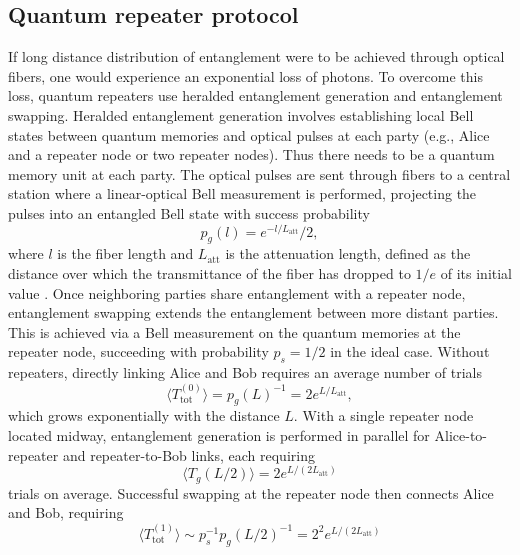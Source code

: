 \subsection{Quantum repeater protocol}
If long distance distribution of entanglement were to be achieved through optical fibers, one would experience an exponential loss of photons.
 To overcome this loss, quantum repeaters use heralded entanglement generation and entanglement swapping.
 Heralded entanglement generation involves establishing
 local Bell states between quantum memories and optical pulses at each party (e.g., Alice and a repeater node or two repeater nodes).
 Thus there needs to be a quantum memory unit at each party. The optical pulses are sent through fibers to a central station where a linear-optical Bell measurement is performed,
 projecting the pulses into an entangled Bell state with success probability 
 \begin{equation}
    p_g(l) = e^{-l/L_{\text{att}}}/2,
 \end{equation}
 where $l$ is the fiber length and $L_{\text{att}}$ is the attenuation length, defined as the distance over which the transmittance of the fiber has dropped to $1/e$ of its initial value \cite{Azuma:2023}.%
 Once neighboring parties share entanglement with a repeater node, entanglement swapping extends the entanglement between more distant parties.
 This is achieved via a Bell measurement on the quantum memories at the repeater node, succeeding with probability $p_s = 1/2$ in the ideal case.
 Without repeaters, directly linking Alice and Bob requires an average number of trials 
 \begin{equation}
    \langle T^{(0)}_{\text{tot}} \rangle = p_g(L)^{-1} = 2e^{L/L_{\text{att}}},
 \end{equation}
 which grows exponentially with the distance $L$. With a single repeater node located midway, entanglement generation is performed in parallel for Alice-to-repeater and repeater-to-Bob links,
 each requiring 
 \begin{equation}
    \langle T_g(L/2) \rangle = 2e^{L/(2L_{\text{att}})}
 \end{equation}
 trials on average. Successful swapping at the repeater node then connects Alice and Bob,
 requiring 
 \begin{equation}
    \langle T^{(1)}_{\text{tot}} \rangle \sim p_s^{-1} p_g(L/2)^{-1} = 2^2 e^{L/(2L_{\text{att}})}
 \end{equation}
